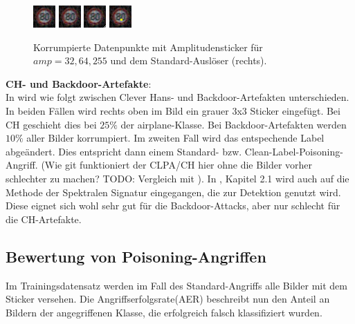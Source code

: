 \documentclass[11pt,a4paper]{article}
\numberwithin{equation}{section}
\begin{document}
	
	\begin{figure}[ht]
		\centering
		\includegraphics[width=0.1\textheight]{32_1corner_infty300.jpeg}
		\includegraphics[width=0.1\textheight]{64_1_coner:infty300.jpeg}
		\includegraphics[width=0.1\textheight]{255_1corner_infty300.jpeg}		\includegraphics[width=0.1\textheight]{sticker_infty300.jpeg}
		\caption[LRP-Schema]{Korrumpierte Datenpunkte mit Amplitudensticker für $amp=32,64,255$ und dem Standard-Auslöser (rechts).}
		
		\label{im:LCPA}
	\end{figure}


	
	\noindent \textbf{CH- und Backdoor-Artefakte}:\\
	In \cite{imagenet_unhansed_v2} wird wie folgt zwischen Clever Hans- und Backdoor-Artefakten unterschieden. In beiden Fällen wird rechts oben im Bild ein grauer 3x3 Sticker eingefügt.
	Bei CH geschieht dies bei $25 \%$ der airplane-Klasse. Bei Backdoor-Artefakten werden $10 \%$ aller Bilder korrumpiert. Im zweiten Fall wird das entspechende Label abgeändert. Dies entspricht dann einem Standard- bzw. Clean-Label-Poisoning-Angriff. (Wie git funktioniert der CLPA/CH hier ohne die Bilder vorher schlechter zu machen? 
	TODO: Vergleich mit \cite{labelconsistent}). In \cite{imagenet_unhansed_v2}, Kapitel 2.1 wird auch auf die Methode der Spektralen Signatur \cite{spectral_signatures} eingegangen, die zur Detektion genutzt wird. Diese eignet sich wohl sehr gut für die Backdoor-Attacks, aber nur schlecht für die CH-Artefakte.
	
	\subsection{Bewertung von Poisoning-Angriffen}
	
	
	Im Trainingsdatensatz werden im Fall des Standard-Angriffs alle Bilder mit dem
	Sticker versehen. Die Angriffserfolgsrate(AER) beschreibt nun den Anteil an Bildern
	der angegriffenen Klasse, die erfolgreich falsch klassifiziert wurden.
	
\end{document}
